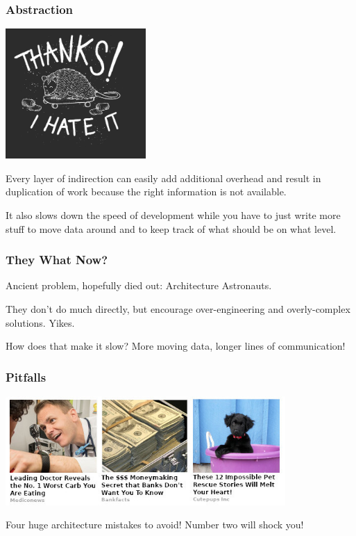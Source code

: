 \begin{frame}
\frametitle{Abstraction}
\begin{center}
	\includegraphics[width=0.4\textwidth]{images/thanks.jpg}
\end{center}

Every layer of indirection can easily add additional overhead and result in duplication of work because the right information is not available.

It also slows down the speed of development while you have to just write more stuff to move data around and to keep track of what should be on what level.

\end{frame}

\begin{frame}
\frametitle{They What Now?}
Ancient problem, hopefully died out: \alert{Architecture Astronauts}.

They don't do much directly, but encourage over-engineering and overly-complex solutions. Yikes.

How does that make it slow? More moving data, longer lines of communication!

\end{frame}

\begin{frame}
\frametitle{Pitfalls}

\begin{center}
	\includegraphics[width=0.8\textwidth]{images/clickbait.jpg}
\end{center}

Four huge architecture mistakes to avoid! Number two will shock you! 

\end{frame}

